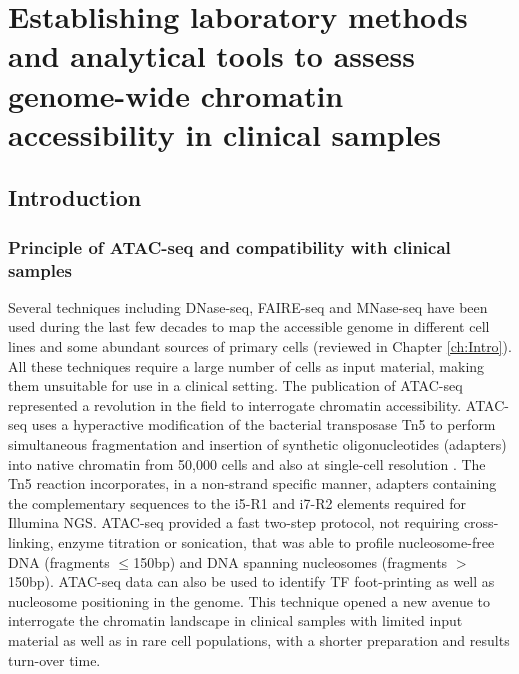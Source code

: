 \chapter{Establishing laboratory methods and analytical tools to assess genome-wide chromatin accessibility in clinical samples}
\label{ch:Results1}


\section{Introduction}
\subsection{Principle of ATAC-seq and compatibility with clinical samples}
Several techniques including DNase-seq, FAIRE-seq and MNase-seq have been used during the last few decades to map the accessible genome in different cell lines and some abundant sources of primary cells (reviewed in Chapter \ref{ch:Intro}). All these techniques require a large number of cells as input material, making them unsuitable for use in a clinical setting. The publication of ATAC-seq represented a revolution in the field to interrogate chromatin accessibility. ATAC-seq uses a hyperactive modification of the bacterial transposase Tn5 to perform simultaneous fragmentation and insertion of synthetic oligonucleotides (adapters) into native chromatin from 50,000 cells and also at single-cell resolution \parencite{Buenrostro2013, Buenrostro2015}. The Tn5 reaction incorporates, in a non-strand specific manner, adapters containing the complementary sequences to the i5-R1 and i7-R2 elements required for Illumina NGS. ATAC-seq provided a fast two-step protocol, not requiring cross-linking, enzyme titration or sonication, that was able to profile nucleosome-free DNA (fragments $\leq$150bp) and DNA spanning nucleosomes (fragments $>$150bp). ATAC-seq data can also be used to identify TF foot-printing as well as nucleosome positioning in the genome. This technique opened a new avenue to interrogate the chromatin landscape in clinical samples with limited input material as well as in rare cell populations, with a shorter preparation and results turn-over time.


